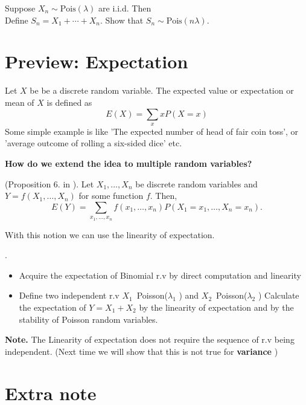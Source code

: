 \begin{exercise}
    Suppose $X_n\sim\text{Pois}(\lambda)$ are i.i.d. Then\\
    Define $S_n=X_1+\cdots+X_n$. Show that $S_n\sim\text{Pois}(n\lambda)$.\\
\end{exercise}





\section{Preview: Expectation}
Let \(X\) be be a discrete random variable. The expected value or expectation or mean of \(X\) is defined as
\[
    E(X) = \sum_{x} x P(X=x)
\]
Some simple example is like 'The expected number of head of fair coin toss', or 'average outcome of rolling a six-sided dice' etc. 

\textbf{How do we extend the idea to multiple random variables?}

\begin{theorem*}
   (Proposition 6. in \cite{Und_Chatterjee}). Let \(X_1,\dots , X_n\) be discrete random variables and 
   \(Y =f(X_1,\dots, X_n) \) for some function \(f\). Then,
   \[
    E(Y) = \sum_{x_1,\dots,x_n}f(x_1,\dots,x_n) P(X_1 = x_1, \dots, X_n = x_n).
   \] 
\end{theorem*}
With this notion we can use the linearity of expectation.

\begin{exercise}
    .\\
    \begin{itemize}
        \item Acquire the expectation of Binomial r.v by direct computation and linearity
        \item Define two independent r.v \(X_1\)~Poisson(\(\lambda_1  \) ) and \(X_2\)~Poisson(\(\lambda_2 \) )  Calculate the expectation of \(Y = X_1 + X_2\) by the linearity of expectation and by the stability of Poisson random variables.
    \end{itemize}
\end{exercise}
\textbf{Note.} The Linearity of expectation does not require the sequence of r.v being independent. (Next time we will show that this is not true for \textbf{variance} )

\section{Extra note}
